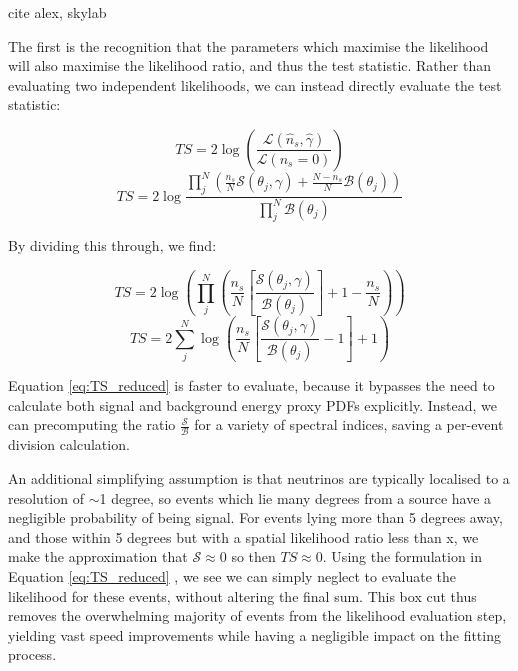 cite alex, skylab

The first is the recognition that the parameters which maximise the likelihood will also maximise the likelihood ratio, and thus the test statistic. Rather than evaluating two independent likelihoods, we can instead directly evaluate the test statistic:

\begin{equation}
	TS = 2 \log \left( \frac{ \mathcal{L}(\hat{n}_{s}, \hat{\gamma}) }{\mathcal{L}(n_{s} = 0)} \right)
\end{equation}
\begin{equation}
TS = 2 \log  \frac{\prod_{j}^{N} \left(\frac{n_{s}}{N} \mathcal{S}(\theta_{j}, \gamma) + \frac{N - n_{s}}{N} \mathcal{B}(\theta_{j})  \right)}{\prod_{j}^{N}\mathcal{B}(\theta_{j})}
\end{equation}

By dividing this through, we find: 

\begin{equation}
	TS =  2 \log \left(  \prod_{j}^{N} \left(\frac{n_{s}}{N} \left[\frac{\mathcal{S}(\theta_{j}, \gamma)}{\mathcal{B}(\theta_{j})} \right] + 1 - \frac{n_{s}}{N} \right) \right) 
\end{equation}
\begin{equation}
	TS = 2 \sum_{j}^{N} \log \left(\frac{n_{s}}{N} \left[ \frac{\mathcal{S}(\theta_{j}, \gamma)}{\mathcal{B}(\theta_{j}) } - 1 \right] + 1 \right) 
\label{eq:TS_reduced}
\end{equation}

Equation \ref{eq:TS_reduced}  is faster to evaluate, because it bypasses the need to calculate both signal and background energy proxy PDFs explicitly. Instead, we can precomputing the ratio $\frac{\mathcal{S}}{\mathcal{B}}$ for a variety of spectral indices, saving a per-event division calculation.

An additional simplifying assumption is that neutrinos are typically localised to a resolution of $\sim$1 degree, so events which lie many degrees from a source have a negligible probability of being signal. For events lying more than 5 degrees away, and those within 5 degrees but with a spatial likelihood ratio less than x, we make the approximation that $\mathcal{S} \approx 0$ so then $TS \approx 0$. Using the formulation in Equation \ref{eq:TS_reduced} , we see we can simply neglect to evaluate the likelihood for these events, without altering the final sum. This box cut thus removes the overwhelming majority of events from the likelihood evaluation step, yielding vast speed improvements while having a negligible impact on the fitting process.
